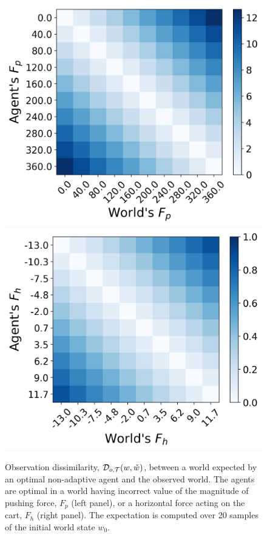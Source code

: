 \begin{figure}
    \centering
    \includegraphics[width=.49\columnwidth]{images/dist_action_force_mag.png}
    \includegraphics[width=.49\columnwidth]{images/dist_env_force.png}
    \caption{Observation dissimilarity, $ {{\cal D}}_{o,{\cal T}}(w, \check{w})$, between a world expected by an optimal non-adaptive agent and the observed world. The agents are optimal in a world having incorrect value of the magnitude of pushing force, $F_p$ (left panel), or a horizontal force acting on the cart, $F_h$ (right panel). The expectation is computed over 20 samples of the initial world state $w_0$.}
    \label{fig:diss}
\end{figure}

